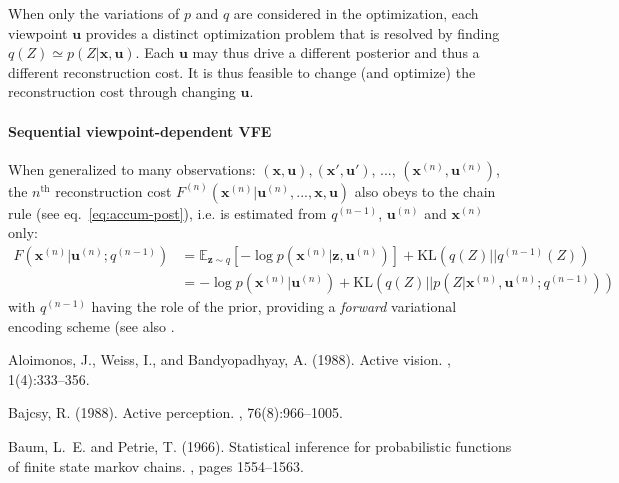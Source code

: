 \documentclass[12pt,twoside,openright]{article}
\begin{document}
When only the variations of $p$ and $q$ are considered in the optimization, each viewpoint $\boldsymbol{u}$ provides a distinct optimization problem that is resolved by finding $q(Z)\simeq p(Z|\boldsymbol{x}, \boldsymbol{u})$. Each $\boldsymbol{u}$ may thus drive a different posterior and thus a different reconstruction cost. It is thus feasible to change (and optimize) the reconstruction cost through changing $\boldsymbol{u}$.

\paragraph{Sequential viewpoint-dependent VFE}
{\color{Purple} 
	When generalized to many observations: $(\boldsymbol{x},\boldsymbol{u}), (\boldsymbol{x}',\boldsymbol{u}')$, ..., $(\boldsymbol{x}^{(n)},\boldsymbol{u}^{(n)})$, the $n^\text{th}$ reconstruction cost $F^{(n)}(\boldsymbol{x}^{(n)}|\boldsymbol{u}^{(n)}, ..., \boldsymbol{x}, \boldsymbol{u})$ also obeys to the chain rule (see eq.~\ref{eq:accum-post}), i.e. is estimated from $q^{(n-1)}$, $\boldsymbol{u}^{(n)}$ and $\boldsymbol{x}^{(n)}$ only:
	\begin{align}
	F(\boldsymbol{x}^{(n)}|\boldsymbol{u}^{(n)}; q^{(n-1)}) 
	&= \mathbb{E}_{\boldsymbol{z} \sim q} \left[-\log p(\boldsymbol{x}^{(n)}| \boldsymbol{z}, \boldsymbol{u}^{(n)} )\right] + \text{KL}(q(Z)||q^{(n-1)}(Z))
	\label{eq:FEP-prior-uxun-app}\\
	&= -\log p(\boldsymbol{x}^{(n)}|\boldsymbol{u}^{(n)}) + \text{KL}(q(Z)||p(Z|\boldsymbol{x}^{(n)},\boldsymbol{u}^{(n)};q^{(n-1)}))
	\label{eq:FEP-posterior-uxun-app}
	\end{align}
	with %
	$q^{(n-1)}$ having the role of the prior, providing a \emph{forward} variational encoding scheme (see also \citep{chung2015recurrent,fraccaro2016sequential}.  
	

\begin{thebibliography}{}
	
	Aloimonos, J., Weiss, I., and Bandyopadhyay, A. (1988).
	\newblock Active vision.
	, 1(4):333--356.
	
	Bajcsy, R. (1988).
	\newblock Active perception.
	, 76(8):966--1005.
	
	Baum, L.~E. and Petrie, T. (1966).
	\newblock Statistical inference for probabilistic functions of finite state
	markov chains.
	, pages 1554--1563.
	

\end{thebibliography}}
\end{document}
